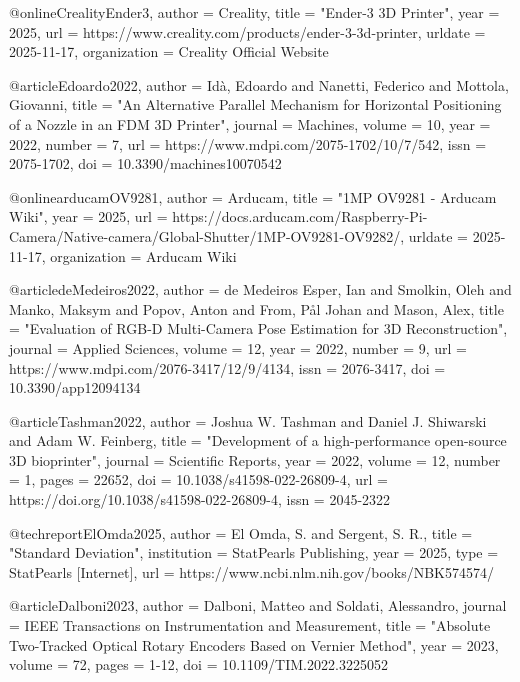 @online{CrealityEnder3,
	author       = {{Creality}},
	title        = "{Ender-3 3D Printer}",
	year         = {2025},
	url          = {https://www.creality.com/products/ender-3-3d-printer},
	urldate      = {2025-11-17},
	organization = {Creality Official Website}
}

@article{Edoardo2022,
	author    = {Idà, Edoardo and Nanetti, Federico and Mottola, Giovanni},
	title     = "{An Alternative Parallel Mechanism for Horizontal Positioning of a Nozzle in an FDM 3D Printer}",
	journal   = {Machines},
	volume    = {10},
	year      = {2022},
	number    = {7},
	url       = {https://www.mdpi.com/2075-1702/10/7/542},
	issn      = {2075-1702},
	doi       = {10.3390/machines10070542}
}

@online{arducamOV9281,
	author       = {{Arducam}},
	title        = "{1MP OV9281 - Arducam Wiki}",
	year         = {2025},
	url          = {https://docs.arducam.com/Raspberry-Pi-Camera/Native-camera/Global-Shutter/1MP-OV9281-OV9282/},
	urldate      = {2025-11-17},
	organization = {Arducam Wiki}
}

@article{deMedeiros2022,
	author    = {de Medeiros Esper, Ian and Smolkin, Oleh and Manko, Maksym and Popov, Anton and From, Pål Johan and Mason, Alex},
	title     = "{Evaluation of RGB-D Multi-Camera Pose Estimation for 3D Reconstruction}",
	journal   = {Applied Sciences},
	volume    = {12},
	year      = {2022},
	number    = {9},
	url       = {https://www.mdpi.com/2076-3417/12/9/4134},
	issn      = {2076-3417},
	doi       = {10.3390/app12094134}
}

@article{Tashman2022,
	author    = {Joshua W. Tashman and Daniel J. Shiwarski and Adam W. Feinberg},
	title     = "{Development of a high-performance open-source 3D bioprinter}",
	journal   = {Scientific Reports},
	year      = {2022},
	volume    = {12},
	number    = {1},
	pages     = {22652},
	doi       = {10.1038/s41598-022-26809-4},
	url       = {https://doi.org/10.1038/s41598-022-26809-4},
	issn      = {2045-2322}
}

@techreport{ElOmda2025,
	author      = {El Omda, S. and Sergent, S. R.},
	title       = "{Standard Deviation}",
	institution = {StatPearls Publishing},
	year        = {2025},
	type        = {StatPearls [Internet]},
	url         = {https://www.ncbi.nlm.nih.gov/books/NBK574574/}
}

@article{Dalboni2023,
	author    = {Dalboni, Matteo and Soldati, Alessandro},
	journal   = {IEEE Transactions on Instrumentation and Measurement}, 
	title     = "{Absolute Two-Tracked Optical Rotary Encoders Based on Vernier Method}", 
	year      = {2023},
	volume    = {72},
	pages     = {1-12},
	doi       = {10.1109/TIM.2022.3225052}
}


